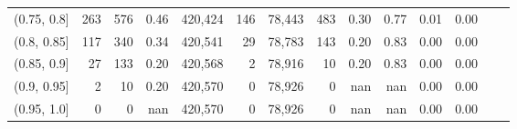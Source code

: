 \begin{tabular}{rrrrrrrrrrrrrr}
(0.75, 0.8]    &      263 &     576 &   0.46 &  420,424 &      146 &  78,443 &     483 &  0.30 &  0.77 &  0.01 &      0.00 \\
(0.8, 0.85]    &      117 &     340 &   0.34 &  420,541 &       29 &  78,783 &     143 &  0.20 &  0.83 &  0.00 &      0.00 \\
(0.85, 0.9]    &       27 &     133 &   0.20 &  420,568 &        2 &  78,916 &      10 &  0.20 &  0.83 &  0.00 &      0.00 \\
(0.9, 0.95]    &        2 &      10 &   0.20 &  420,570 &        0 &  78,926 &       0 &   nan &   nan &  0.00 &      0.00 \\
(0.95, 1.0]    &        0 &       0 &    nan &  420,570 &        0 &  78,926 &       0 &   nan &   nan &  0.00 &      0.00 \\
\bottomrule
\end{tabular}
